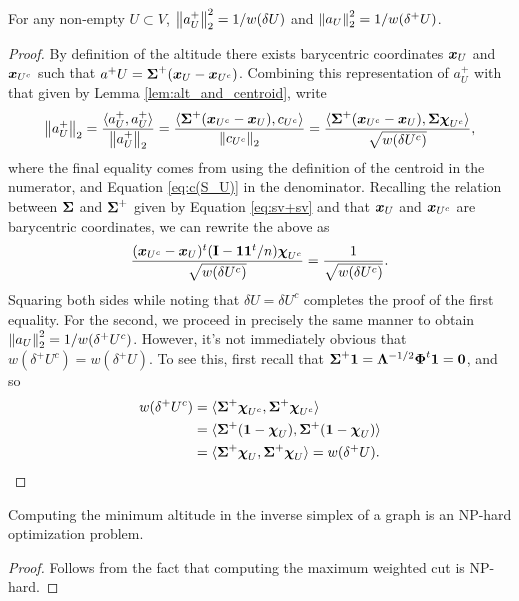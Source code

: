 \begin{lemma}
\label{lem:||alt||}
For any non-empty $U\subset V$, $\norm{a^+_U}_2^2=1/w(\delta U)$ and $\norm{a_U}_2^2 = 1/w(\delta^+ U)$.  
\end{lemma}
\begin{proof}
By definition of the altitude there exists barycentric coordinates $\vb*{x}_U$ and $\vb*{x}_{U^c}$ such that $a^+U = \boldsymbol{\Sigma}^+(\vb*{x}_U-\vb*{x}_{U^c})$. Combining this representation of $a^+_U$ with that given by Lemma \ref{lem:alt_and_centroid}, write 
\begin{align*}
    \norm{a^+_U}_2 = \frac{\langle a^+_U,a^+_U\rangle }{\norm{a^+_U}_2} = \frac{\langle \boldsymbol{\Sigma}^+(\vb*{x}_{U^c}-\vb*{x}_{U}), c_{U^c}\rangle }{\norm{c_{U^c}}_2} = \frac{\langle \boldsymbol{\Sigma}^+(\vb*{x}_{U^c}-\vb*{x}_{U}), \boldsymbol{\Sigma}\boldsymbol{\chi}_{U^c}\rangle }{\sqrt{w(\delta U^c)}},
\end{align*}
where the final equality comes from using the definition of the centroid in the numerator, and Equation \ref{eq:c(S_U)} in the denominator. Recalling the relation between $\boldsymbol{\Sigma}$ and $\boldsymbol{\Sigma}^+$ given by Equation \ref{eq:sv+sv} and that $\vb*{x}_U$ and $\vb*{x}_{U^c}$ are barycentric coordinates, we can rewrite the above as 
\[\frac{(\vb*{x}_{U^c}-\vb*{x}_{U})^t(\vb{I}-\vb{1}\vb{1}^t/n)\boldsymbol{\chi}_{U^c}}{\sqrt{w(\delta U^c)}}=\frac{1}{\sqrt{w(\delta U^c)}}. \]
Squaring both sides while noting that $\delta U = \delta U^c$ completes the proof of the first equality. For the second, we proceed in precisely the same manner to obtain $\norm{a_U}_2^2 = 1/w(\delta^+ U^c)$. However, it's not immediately obvious that $w(\delta^+U^c)=w(\delta^+U)$. To see this, first recall that $\boldsymbol{\Sigma}^+\vb{1} = \vb{\Lambda}^{-1/2}\boldsymbol{\Phi}^t\vb{1} = \vb{0}$, and so 
\begin{align*}
w(\delta^+ U^c) &= \langle \boldsymbol{\Sigma}^+\boldsymbol{\chi}_{U^c},\boldsymbol{\Sigma}^+\boldsymbol{\chi}_{U^c}\rangle  \\
&= \langle \boldsymbol{\Sigma}^+(\vb{1} - \boldsymbol{\chi}_{U}),\boldsymbol{\Sigma}^+(\vb{1} - \boldsymbol{\chi}_{U})\rangle  \\
&= \langle \boldsymbol{\Sigma}^+\boldsymbol{\chi}_{U},\boldsymbol{\Sigma}^+\boldsymbol{\chi}_{U}\rangle = w(\delta^+ U).
\qedhere
\end{align*}
\end{proof}

\begin{corollary}
Computing the minimum altitude in the inverse simplex of a graph is an NP-hard optimization problem. 
\end{corollary}
\begin{proof}
Follows from the fact that computing the maximum weighted cut is NP-hard. 
\end{proof}

